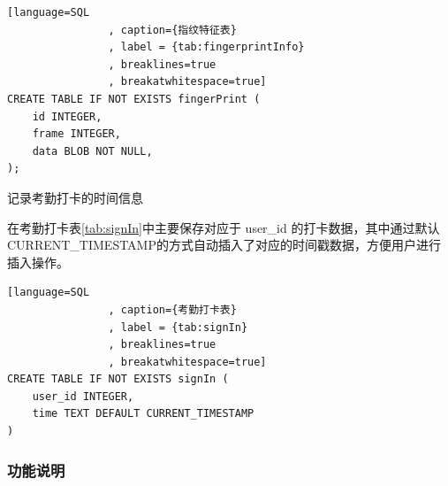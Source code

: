 \begin{description}
            \begin{lstlisting}[language=SQL
                , caption={指纹特征表}
                , label = {tab:fingerprintInfo}
                , breaklines=true
                , breakatwhitespace=true]
CREATE TABLE IF NOT EXISTS fingerPrint (
    id INTEGER,
    frame INTEGER,
    data BLOB NOT NULL,
);
            \end{lstlisting}          


        \item[考勤打卡表] 记录考勤打卡的时间信息
        
            在考勤打卡表\ref{tab:signIn}中主要保存对应于 user\_id 的打卡数据，其中通过默认CURRENT\_TIMESTAMP的方式自动插入了对应的时间戳数据，方便用户进行插入操作。

            \begin{lstlisting}[language=SQL
                , caption={考勤打卡表}
                , label = {tab:signIn}
                , breaklines=true
                , breakatwhitespace=true]
CREATE TABLE IF NOT EXISTS signIn (
    user_id INTEGER,
    time TEXT DEFAULT CURRENT_TIMESTAMP
)
            \end{lstlisting}    

    \end{description}

    \subsubsection{功能说明}

